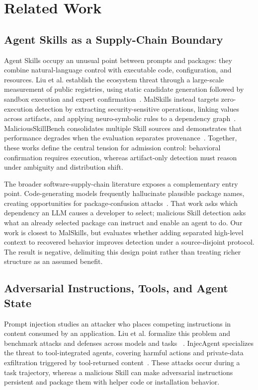 \section{Related Work}
\label{sec:related}

\subsection{Agent Skills as a Supply-Chain Boundary}

Agent Skills occupy an unusual point between prompts and packages: they combine
natural-language control with executable code, configuration, and resources.
Liu et al. establish the ecosystem threat through a large-scale measurement of
public registries, using static candidate generation followed by sandbox
execution and expert confirmation~\cite{liu2026maliciousskills}. MalSkills
instead targets zero-execution detection by extracting security-sensitive
operations, linking values across artifacts, and applying neuro-symbolic rules
to a dependency graph~\cite{wang2026malskills}. MaliciousSkillBench consolidates
multiple Skill sources and demonstrates that performance degrades when the
evaluation separates provenance~\cite{wang2026maliciousskillbench}. Together,
these works define the central tension for admission control: behavioral
confirmation requires execution, whereas artifact-only detection must reason
under ambiguity and distribution shift.

The broader software-supply-chain literature exposes a complementary entry
point. Code-generating models frequently hallucinate plausible package names,
creating opportunities for package-confusion attacks~\cite{spracklen2025package}.
That work asks which dependency an LLM causes a developer to select; malicious
Skill detection asks what an already selected package can instruct and enable
an agent to do. Our work is closest to MalSkills, but evaluates whether adding
separated high-level context to recovered behavior improves detection under a
source-disjoint protocol. The result is negative, delimiting this design point
rather than treating richer structure as an assumed benefit.

\subsection{Adversarial Instructions, Tools, and Agent State}

Prompt injection studies an attacker who places competing instructions in
content consumed by an application. Liu et al. formalize this problem and
benchmark attacks and defenses across models and tasks
~\cite{liu2024promptinjection}. InjecAgent specializes the threat to
tool-integrated agents, covering harmful actions and private-data exfiltration
triggered by tool-returned content~\cite{zhan2024injecagent}. These attacks occur
during a task trajectory, whereas a malicious Skill can make adversarial
instructions persistent and package them with helper code or installation
behavior.

